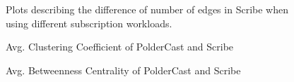 \begin{figure}
    \centering
    \label{fig:scribe_edges}
    \caption{Plots describing the difference of number of edges in
        Scribe when using different subscription workloads.}
\end{figure}

\begin{figure}[H]
    \centering
    
    \caption{Avg. Clustering Coefficient of PolderCast and Scribe}
    \label{fig:eval_cc}
\end{figure}

\begin{figure}[H]
    \centering
    
    \caption{Avg. Betweenness Centrality of PolderCast and Scribe}
    \label{fig:eval_betweenness}
\end{figure}

